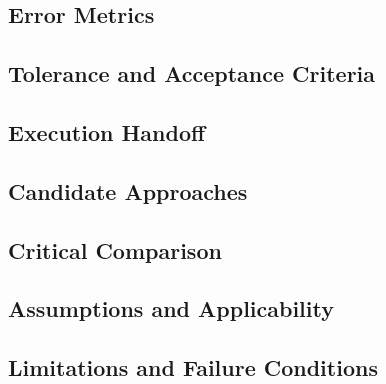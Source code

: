 \subsection{Error Metrics}
\label{sec:res-ver-bmk-error-metrics}


\subsection{Tolerance and Acceptance Criteria}
\label{sec:res-ver-bmk-tolerance-acceptance-criteria}


\subsection{Execution Handoff}
\label{sec:res-ver-bmk-execution-handoff}


\subsection{Candidate Approaches}
\label{sec:res-ver-bmk-candidate-approaches}


\subsection{Critical Comparison}
\label{sec:res-ver-bmk-critical-comparison}


\subsection{Assumptions and Applicability}
\label{sec:res-ver-bmk-assumptions}


\subsection{Limitations and Failure Conditions}
\label{sec:res-ver-bmk-limitations}


